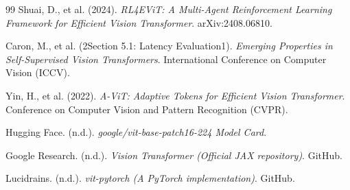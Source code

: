 \begin{thebibliography}{99}
Shuai, D., et al. (2024). \textit{RL4EViT: A Multi-Agent Reinforcement Learning Framework for Efficient Vision Transformer}. arXiv:2408.06810.

Caron, M., et al. (2Section 5.1: Latency Evaluation1). \textit{Emerging Properties in Self-Supervised Vision Transformers}. International Conference on Computer Vision (ICCV).

Yin, H., et al. (2022). \textit{A-ViT: Adaptive Tokens for Efficient Vision Transformer}. Conference on Computer Vision and Pattern Recognition (CVPR).

Hugging Face. (n.d.). \textit{google/vit-base-patch16-224 Model Card}.

Google Research. (n.d.). \textit{Vision Transformer (Official JAX repository)}. GitHub.

Lucidrains. (n.d.). \textit{vit-pytorch (A PyTorch implementation)}. GitHub.

\end{thebibliography}